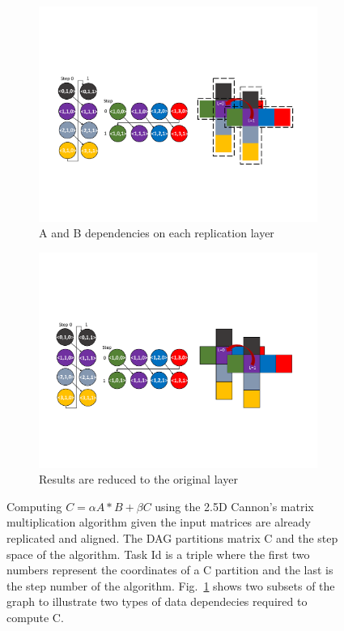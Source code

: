\begin{figure}[htb]
\centering
\begin{subfigure}[b]{0.45\textwidth}
\includegraphics[width=\textwidth]{figures/cannon0.pdf}
\caption{A and B dependencies on each replication layer}
\label{deps}
\end{subfigure}
\begin{subfigure}[b]{0.37\textwidth}
\includegraphics[width=\textwidth]{figures/cannon1.pdf}
\caption{Results are reduced to the original layer}
\label{dataspace}
\end{subfigure}
\caption{Computing $C= \alpha A * B + \beta C$ using the 2.5D Cannon's matrix multiplication algorithm given the input matrices are already replicated and aligned. 
The DAG partitions matrix C and the step space of the algorithm.
Task Id is a triple where the first two numbers represent the coordinates of a C partition and the last is the step number of the algorithm. 
Fig.~\ref{deps} shows two subsets of the graph to illustrate two types of data dependecies required to compute C.}
\label{fig:25DCannon}
\end{figure}

